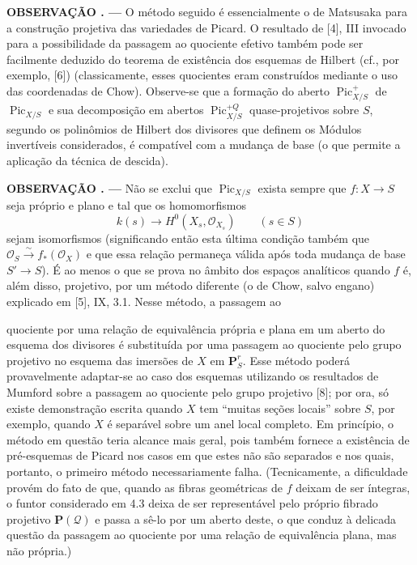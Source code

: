 \documentclass[11pt,twoside,openany]{book}
\numberwithin{equation}{section}
\newcommand{\src}[1]{%
  \phantomsection\hypertarget{src:#1}{}%
  \marginpar{\raggedleft\footnotesize\sffamily #1}%
}
\theoremstyle{plain}
\theoremstyle{definition}
\theoremstyle{remark}
\newcommand{\result}[2]{%
  \par\medskip\noindent\textbf{#1%
  \if\relax\detokenize{#2}\relax\else\space#2\fi. ---}\enspace
}
\newcommand{\FgaUnitKey}{frontmatter}
\renewcommand{\src}[1]{%
  \phantomsection\hypertarget{src:\FgaUnitKey:#1}{}%
  \marginpar{\raggedleft\footnotesize\sffamily #1}%
}
\begin{document}
\result{OBSERVAÇÃO}{5.1} O método seguido é essencialmente o de Matsusaka para
a construção projetiva das variedades de Picard. O resultado de [4], III
invocado para a possibilidade da passagem ao quociente efetivo também pode ser
facilmente deduzido do teorema de existência dos esquemas de Hilbert (cf., por
exemplo, [6]) (classicamente, esses quocientes eram construídos mediante o uso
das coordenadas de Chow). Observe-se que a formação do aberto
$\operatorname{Pic}^{+}_{X/S}$ de $\operatorname{Pic}_{X/S}$ e sua decomposição
em abertos $\operatorname{Pic}^{+Q}_{X/S}$ quase-projetivos sobre $S$, segundo
os polinômios de Hilbert dos divisores que definem os Módulos invertíveis
considerados, é compatível com a mudança de base (o que permite a aplicação da
técnica de descida).

\result{OBSERVAÇÃO}{5.2} Não se exclui que $\operatorname{Pic}_{X/S}$ exista
sempre que $f:X\longrightarrow S$ seja próprio e plano e tal que os
homomorfismos
\[
k(s)\longrightarrow H^0(X_s,\mathcal O_{X_s})\qquad(s\in S)
\]
sejam isomorfismos (significando então esta última condição também que
$\mathcal O_S\xrightarrow{\sim}f_*(\mathcal O_X)$ e que essa relação permaneça
válida após toda mudança de base $S'\longrightarrow S$). É ao menos o que se
prova no âmbito dos espaços analíticos quando $f$ é, além disso, projetivo, por
um método diferente (o de Chow, salvo engano) explicado em [5], IX,
3.1. Nesse método, a passagem ao
\src{156}
quociente por uma relação de equivalência própria e plana em um aberto do
esquema dos divisores é substituída por uma passagem ao quociente pelo grupo
projetivo no esquema das imersões de $X$ em $\mathbf P^r_S$. Esse método poderá
provavelmente adaptar-se ao caso dos esquemas utilizando os resultados de
Mumford sobre a passagem ao quociente pelo grupo projetivo [8]; por ora, só
existe demonstração escrita quando $X$ tem ``muitas seções locais'' sobre $S$,
por exemplo, quando $X$ é separável sobre um anel local completo.
 Em princípio, o método em questão teria alcance mais geral,
pois também fornece a existência de pré-esquemas de Picard nos casos em que
estes não são separados e nos quais, portanto, o primeiro método necessariamente
falha. (Tecnicamente, a dificuldade provém do fato de que, quando as fibras
geométricas de $f$ deixam de ser íntegras, o funtor considerado em 4.3 deixa de
ser representável pelo próprio fibrado projetivo $\mathbf P(\mathcal Q)$ e
passa a sê-lo por um aberto deste, o que conduz à delicada questão da passagem
ao quociente por uma relação de equivalência plana, mas não própria.)
\end{document}

